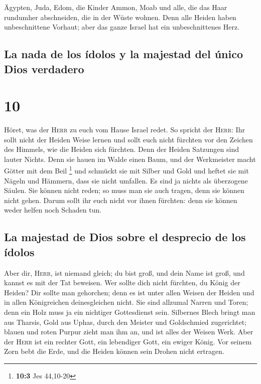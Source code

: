  Ägypten, Juda, Edom, die Kinder Ammon, Moab und alle,
die das Haar rundumher abschneiden, die in der Wüste wohnen. Denn alle
Heiden haben unbeschnittene Vorhaut; aber das ganze Israel hat ein
unbeschnittenes Herz.

\hypertarget{la-nada-de-los-uxeddolos-y-la-majestad-del-uxfanico-dios-verdadero}{%
\subsection{La nada de los ídolos y la majestad del único Dios
verdadero}\label{la-nada-de-los-uxeddolos-y-la-majestad-del-uxfanico-dios-verdadero}}

\hypertarget{section-9}{%
\section{10}\label{section-9}}

 Höret, was der \textsc{Herr} zu euch vom Hause Israel
redet.  So spricht der \textsc{Herr}: Ihr sollt nicht der
Heiden Weise lernen und sollt euch nicht fürchten vor den Zeichen des
Himmels, wie die Heiden sich fürchten.  Denn der Heiden
Satzungen sind lauter Nichts. Denn sie hauen im Walde einen Baum, und
der Werkmeister macht Götter mit dem Beil \footnote{\textbf{10:3} Jes
  44,10-20}  und schmückt sie mit Silber und Gold und
heftet sie mit Nägeln und Hämmern, dass sie nicht umfallen.
 Es sind ja nichts als überzogene Säulen. Sie können nicht
reden; so muss man sie auch tragen, denn sie können nicht gehen. Darum
sollt ihr euch nicht vor ihnen fürchten: denn sie können weder helfen
noch Schaden tun.

\hypertarget{la-majestad-de-dios-sobre-el-desprecio-de-los-uxeddolos}{%
\subsection{La majestad de Dios sobre el desprecio de los
ídolos}\label{la-majestad-de-dios-sobre-el-desprecio-de-los-uxeddolos}}

 Aber dir, \textsc{Herr}, ist niemand gleich; du bist
groß, und dein Name ist groß, und kannst es mit der Tat beweisen.
 Wer sollte dich nicht fürchten, du König der Heiden? Dir
sollte man gehorchen; denn es ist unter allen Weisen der Heiden und in
allen Königreichen deinesgleichen nicht.  Sie sind
allzumal Narren und Toren; denn ein Holz muss ja ein nichtiger
Gottesdienst sein.  Silbernes Blech bringt man aus
Tharsis, Gold aus Uphas, durch den Meister und Goldschmied zugerichtet;
blauen und roten Purpur zieht man ihm an, und ist alles der Weisen Werk.
 Aber der \textsc{Herr} ist ein rechter Gott, ein
lebendiger Gott, ein ewiger König. Vor seinem Zorn bebt die Erde, und
die Heiden können sein Drohen nicht ertragen.

